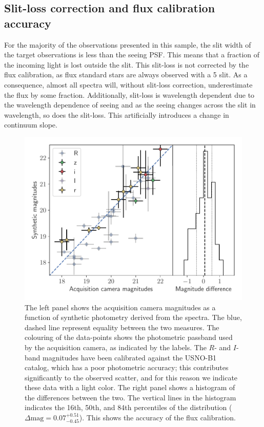 \documentclass[longauth]{aa}    %
\begin{document}
\subsection{Slit-loss correction and flux calibration accuracy} \label{fluxes}

For the majority of the observations presented in this sample, the slit width of
the target observations is less than the seeing PSF. This means that a fraction
of the incoming light is lost outside the slit. This slit-loss is not corrected
by the flux calibration, as flux standard stars are always observed with a
5\arcsec{} slit. As a consequence, almost all spectra will, without slit-loss
correction, underestimate the flux by some fraction. Additionally, slit-loss
is wavelength dependent due to the wavelength dependence of seeing
\citep{Boyd1978} and as the seeing changes across the slit in wavelength, so
does the slit-loss. This artificially introduces a change in continuum slope.

\begin{figure}[!t]
	\centerline{\includegraphics[width=\columnwidth]{figures/flux_accuracy}}
\caption{The left panel shows the acquisition camera magnitudes as a function
	of synthetic photometry derived from the spectra. The blue, dashed line
	represent equality between the two measures. The colouring of the data-points
	shows the photometric passband used by the acquisition camera, as indicated by
	the labels. The $R$- and $I$- band magnitudes have been calibrated against the
	USNO-B1 catalog, which has a poor photometric accuracy; this contributes
	significantly to the observed scatter, and for this reason we indicate these
	data with a light color.  The right panel shows a histogram of the differences
	between the two. The vertical lines in the histogram indicates the 16th, 50th,
	and 84th percentiles of the distribution ($\Delta \mathrm{mag} = 0.07 ^{+0.51}
	_{-0.45} $). This shows the accuracy of the flux calibration.}
\label{fig:flux_acq}
\end{figure}
\end{document}
